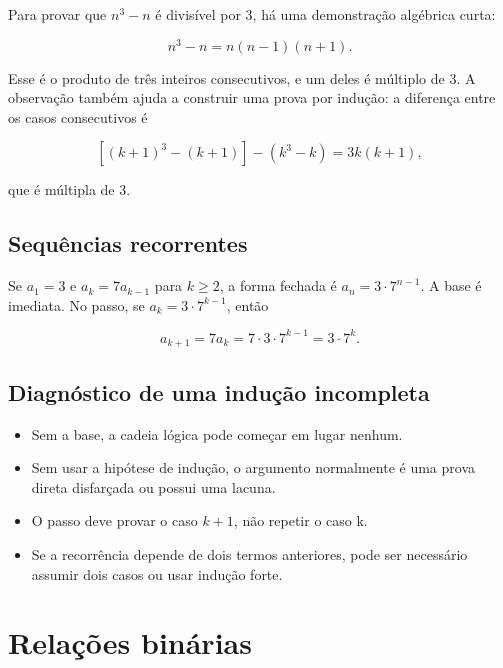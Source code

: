 \documentclass[12pt,a4paper,openany]{book}
\begin{document}
Para provar que $n^3-n$ é divisível por 3, há uma demonstração algébrica curta:



\[n^3-n=n(n-1)(n+1).\]



Esse é o produto de três inteiros consecutivos, e um deles é múltiplo de 3. A observação também ajuda a construir uma prova por indução: a diferença entre os casos consecutivos é



\[[(k+1)^3-(k+1)]-(k^3-k)=3k(k+1),\]



que é múltipla de 3.



\section{Sequências recorrentes}



Se $a_1=3$ e $a_k=7a_{k-1}$ para $k\geq2$, a forma fechada é $a_n=3\cdot7^{n-1}$. A base é imediata. No passo, se $a_k=3\cdot7^{k-1}$, então



\[a_{k+1}=7a_k=7\cdot3\cdot7^{k-1}=3\cdot7^k.\]



\section{Diagnóstico de uma indução incompleta}



\begin{itemize}
\item Sem a base, a cadeia lógica pode começar em lugar nenhum.
\item Sem usar a hipótese de indução, o argumento normalmente é uma prova direta disfarçada ou possui uma lacuna.
\item O passo deve provar o caso $k+1$, não repetir o caso k.
\item Se a recorrência depende de dois termos anteriores, pode ser necessário assumir dois casos ou usar indução forte.
\end{itemize}



\chapter{Relações binárias}
\end{document}
